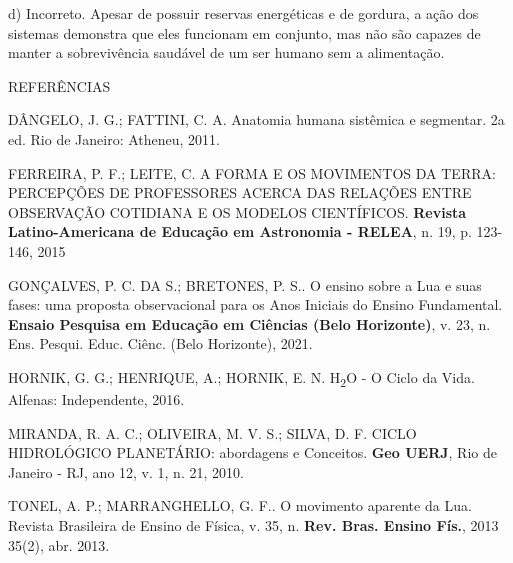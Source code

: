 d) Incorreto. Apesar de possuir reservas energéticas e de gordura, a
ação dos sistemas demonstra que eles funcionam em conjunto, mas não são
capazes de manter a sobrevivência saudável de um ser humano sem a
alimentação.

\protect\hypertarget{_f1xt82slvdl5}{}{}REFERÊNCIAS

DÂNGELO, J. G.; FATTINI, C. A. Anatomia humana sistêmica e segmentar. 2a
ed. Rio de Janeiro: Atheneu, 2011.

FERREIRA, P. F.; LEITE, C. A FORMA E OS MOVIMENTOS DA TERRA: PERCEPÇÕES
DE PROFESSORES ACERCA DAS RELAÇÕES ENTRE OBSERVAÇÃO COTIDIANA E OS
MODELOS CIENTÍFICOS. \textbf{Revista Latino-Americana de Educação em
Astronomia - RELEA}, n. 19, p. 123-146, 2015

GONÇALVES, P. C. DA S.; BRETONES, P. S.. O ensino sobre a Lua e suas
fases: uma proposta observacional para os Anos Iniciais do Ensino
Fundamental. \textbf{Ensaio Pesquisa em Educação em Ciências (Belo
Horizonte)}, v. 23, n. Ens. Pesqui. Educ. Ciênc. (Belo Horizonte), 2021.

HORNIK, G. G.; HENRIQUE, A.; HORNIK, E. N. H\textsubscript{2}O - O Ciclo
da Vida. Alfenas: Independente, 2016.

MIRANDA, R. A. C.; OLIVEIRA, M. V. S.; SILVA, D. F. CICLO HIDROLÓGICO
PLANETÁRIO: abordagens e Conceitos. \textbf{Geo UERJ}, Rio de Janeiro -
RJ, ano 12, v. 1, n. 21, 2010.

TONEL, A. P.; MARRANGHELLO, G. F.. O movimento aparente da Lua. Revista
Brasileira de Ensino de Física, v. 35, n. \textbf{Rev. Bras. Ensino
Fís.}, 2013 35(2), abr. 2013.

